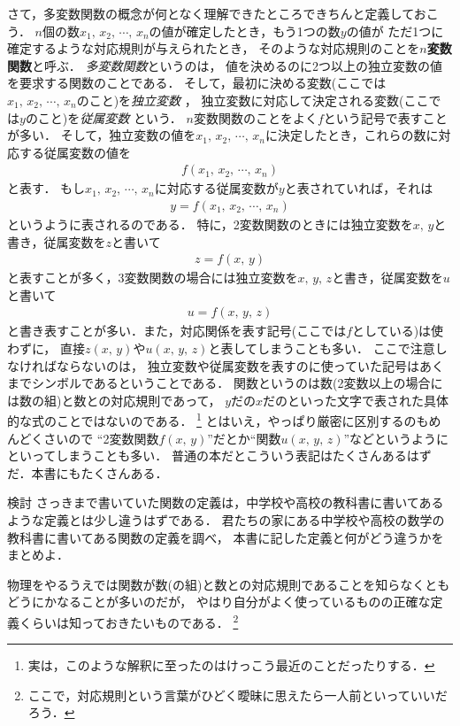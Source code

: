 さて，多変数関数の概念が何となく理解できたところできちんと定義しておこう．
$n$個の数$ x_1, \, x_2, \, \cdots , \, x_n $の値が確定したとき，もう1つの数$y$の値が
ただ1つに確定するような対応規則が与えられたとき，
そのような対応規則のことを\textbf{$n$変数関数}と呼ぶ．
\emph{多変数関数}というのは，
値を決めるのに2つ以上の独立変数の値を要求する関数のことである．
そして，最初に決める変数(ここでは$ x_1, \, x_2, \, \cdots , \, x_n $のこと)を\emph{独立変数}
，
独立変数に対応して決定される変数(ここでは$y$のこと)を\emph{従属変数}
という．
$n$変数関数のことをよく$f$という記号で表すことが多い．
そして，独立変数の値を$ x_1, \, x_2, \, \cdots , \, x_n $に決定したとき，これらの数に対応する従属変数の値を
\begin{align*}
f( x_1, \, x_2, \, \cdots , \, x_n)
\end{align*}
と表す．
もし$x_1, \, x_2, \, \cdots , \, x_n$に対応する従属変数が$y$と表されていれば，それは
\begin{align}
y = f(x_1, \, x_2, \, \cdots , \, x_n)
\label{eq:nhensu}
\end{align}
というように表されるのである．
特に，2変数関数のときには独立変数を$x, \, y$と書き，従属変数を$z$と書いて
\begin{align}
z = f(x, \, y)
\label{2hensu}
\end{align}
と表すことが多く，3変数関数の場合には独立変数を$x, \, y, \, z$と書き，従属変数を$u$と書いて
\begin{align}
u = f(x, \, y, \, z)
\label{eq:3hensu}
\end{align}
と書き表すことが多い．また，対応関係を表す記号(ここでは$f$としている)は使わずに，
直接$z(x, \, y)$や$u(x, \, y, \, z)$と表してしまうことも多い．
ここで注意しなければならないのは，
独立変数や従属変数を表すのに使っていた記号はあくまでシンボルであるということである．
関数というのは数(2変数以上の場合には数の組)と数との対応規則であって，
$y$だの$x$だのといった文字で表された具体的な式のことではないのである．
\footnote{実は，このような解釈に至ったのはけっこう最近のことだったりする．}
とはいえ，やっぱり厳密に区別するのもめんどくさいので
``2変数関数$f(x, \, y)$''だとか``関数$u(x, \, y,\, z)$''などというようにといってしまうことも多い．
普通の本だとこういう表記はたくさんあるはずだ．本書にもたくさんある．

\begin{itembox}[l]{検討}
さっきまで書いていた関数の定義は，中学校や高校の教科書に書いてあるような定義とは少し違うはずである．
君たちの家にある中学校や高校の数学の教科書に書いてある関数の定義を調べ，
本書に記した定義と何がどう違うかをまとめよ．
\end{itembox}
物理をやるうえでは関数が数(の組)と数との対応規則であることを知らなくともどうにかなることが多いのだが，
やはり自分がよく使っているものの正確な定義くらいは知っておきたいものである．
\footnote{ここで，対応規則という言葉がひどく曖昧に思えたら一人前といっていいだろう．}
\newpage
